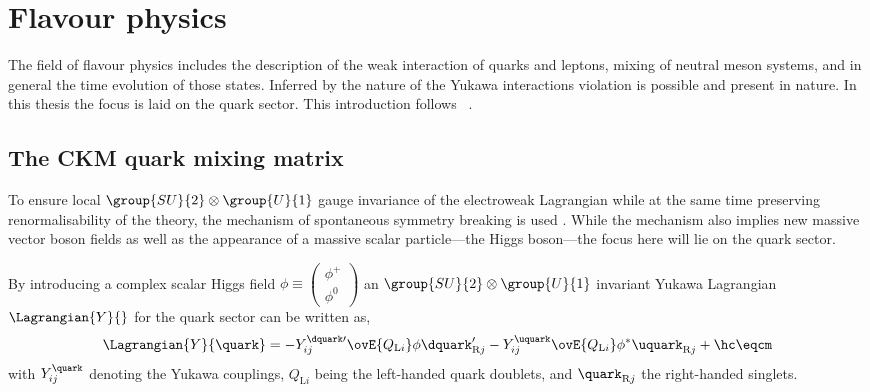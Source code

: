 
\section{Flavour physics}
\label{sec:cpv_theory:flavour_physics}

The field of flavour physics includes the description of the weak interaction of
quarks and leptons, mixing of neutral meson systems, and in general the time
evolution of those states. Inferred by the nature of the Yukawa interactions \CP
violation is possible and present in nature. In this thesis the focus is laid on
the quark sector. This introduction follows \Refs~\cite{Branco:1999fs,Bigi:2000yz,Agashe:2014kda}.

\subsection{The \acs{CKM} quark mixing matrix}
\label{sec:cpv_theory:flavour_physics:ckm_matrix}

To ensure local $\group{SU}{2}\otimes\group{U}{1}$ gauge invariance of the
electroweak Lagrangian while at the same time preserving renormalisability of
the theory, the mechanism of spontaneous symmetry breaking is used
\cite{set:higgs}. While the mechanism also implies new massive vector boson
fields as well as the appearance of a massive scalar particle---the Higgs
boson---the focus here will lie on the quark sector.

By introducing a complex scalar Higgs field $\phi \equiv
\left(\begin{smallmatrix} \phi ^{+} \\ \phi^{0}\end{smallmatrix}\right)$ an
$\group{SU}{2}\otimes\group{U}{1}$ invariant Yukawa Lagrangian
$\Lagrangian{Y}{}$ for the quark sector can be written as,
%
\begin{equation}\label{sec:cpv_theory:flavour_physics:ckm_matrix:yukawa_lagrangian}
  \Lagrangian{Y}{\quark} = -Y_{ij}^{\dquark\prime} \ovE{Q_{\text{L}i}} \phi \dquark_{\text{R}j}^{\prime} - Y_{ij}^{\uquark} \ovE{Q_{\text{L}i}} \phi^{\ast} \uquark_{\text{R}j} + \hc \eqcm
\end{equation}
%
with $Y_{ij}^{\quark}$ denoting the Yukawa couplings, $Q_{\text{L}i}$ being the
left-handed quark doublets, and $\quark_{\text{R}j}$ the right-handed singlets. 


